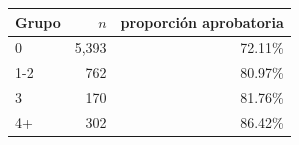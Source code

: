 \begin{tabular}{lrr}
\toprule
Grupo & $n$ & proporción aprobatoria \\
\midrule
0 & 5,393 & 72.11\% \\
1-2 & 762 & 80.97\% \\
3 & 170 & 81.76\% \\
4+ & 302 & 86.42\% \\
\bottomrule
\end{tabular}
